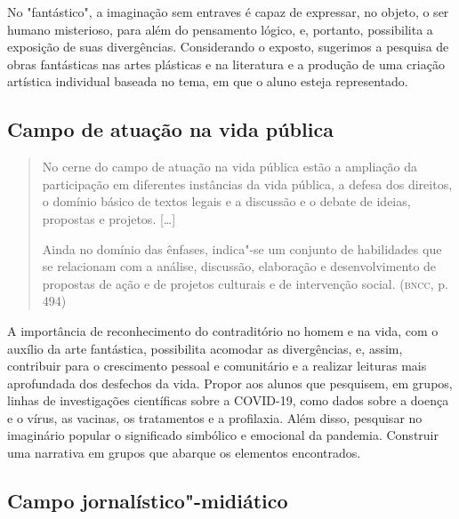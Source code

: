 \documentclass[11pt]{extarticle}
\begin{document}
No "fantástico", a imaginação sem entraves é capaz de expressar, no
objeto, o ser humano misterioso, para além do pensamento lógico, e,
portanto, possibilita a exposição de suas divergências. Considerando o
exposto, sugerimos a pesquisa de obras fantásticas nas artes plásticas
e na literatura e a produção de uma criação artística individual
baseada no tema, em que o aluno esteja representado.


\subsection{Campo de atuação na vida pública}

\begin{quote}
No cerne do campo de atuação na vida pública estão a ampliação da
participação em diferentes instâncias da vida pública, a defesa dos
direitos, o domínio básico de textos legais e a discussão e o debate de
ideias, propostas e projetos. {[}\ldots{}{]}

Ainda no domínio das ênfases, indica"-se um conjunto de habilidades que
se relacionam com a análise, discussão, elaboração e desenvolvimento de
propostas de ação e de projetos culturais e de intervenção social.
(\textsc{bncc}, p. 494)
\end{quote}

A importância de reconhecimento do contraditório no homem e na vida,
com o auxílio da arte fantástica, possibilita acomodar as
divergências, e, assim, contribuir para o crescimento pessoal e
comunitário e a realizar leituras mais aprofundada dos desfechos da
vida. Propor aos alunos que pesquisem, em grupos, linhas de
investigações científicas sobre a COVID-19, como dados sobre a doença
e o vírus, as vacinas, os tratamentos e a profilaxia. Além disso,
pesquisar no imaginário popular o significado simbólico e emocional da
pandemia. Construir uma narrativa em grupos que abarque os elementos
encontrados.

\subsection{Campo jornalístico"-midiático}
\end{document}
